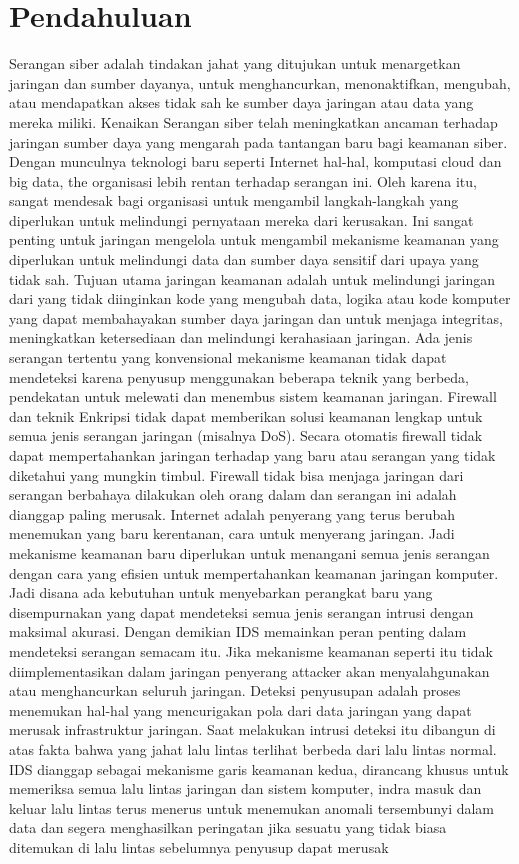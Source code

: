 \documentclass[conference]{IEEEtran}
\begin{document}
\section{Pendahuluan}
Serangan siber adalah tindakan jahat yang ditujukan untuk menargetkan jaringan dan sumber dayanya, untuk menghancurkan, menonaktifkan, mengubah, atau mendapatkan akses tidak sah ke sumber daya jaringan atau data yang mereka miliki\cite{bechhofer2009owl}. Kenaikan Serangan siber telah meningkatkan ancaman terhadap jaringan sumber daya yang mengarah pada tantangan baru bagi keamanan siber. Dengan munculnya teknologi baru seperti Internet hal-hal, komputasi cloud dan big data, the organisasi lebih rentan terhadap serangan ini. Oleh karena itu, sangat mendesak bagi organisasi untuk mengambil langkah-langkah yang diperlukan untuk melindungi pernyataan mereka dari kerusakan\cite{masoodi2019security}. Ini sangat penting untuk jaringan mengelola untuk mengambil mekanisme keamanan yang diperlukan untuk melindungi data dan sumber daya sensitif dari upaya yang tidak sah. Tujuan utama jaringan keamanan adalah untuk melindungi jaringan dari yang tidak diinginkan kode yang mengubah data, logika atau kode komputer yang dapat membahayakan sumber daya jaringan dan untuk menjaga integritas, meningkatkan ketersediaan dan melindungi kerahasiaan jaringan. Ada jenis serangan tertentu yang konvensional mekanisme keamanan tidak dapat mendeteksi karena penyusup menggunakan beberapa teknik yang berbeda, pendekatan untuk melewati dan menembus sistem keamanan jaringan. Firewall dan teknik Enkripsi tidak dapat memberikan solusi keamanan lengkap untuk semua jenis serangan jaringan (misalnya DoS). Secara otomatis firewall tidak dapat mempertahankan jaringan terhadap yang baru atau serangan yang tidak diketahui yang mungkin timbul. Firewall tidak bisa menjaga jaringan dari serangan berbahaya dilakukan oleh orang dalam dan serangan ini adalah dianggap paling merusak\cite{bamhdi2021ensemble}. Internet adalah penyerang yang terus berubah menemukan yang baru kerentanan, cara untuk menyerang jaringan. Jadi mekanisme keamanan baru diperlukan untuk menangani semua jenis serangan dengan cara yang efisien untuk mempertahankan keamanan jaringan komputer. Jadi disana ada kebutuhan untuk menyebarkan perangkat baru yang disempurnakan yang dapat mendeteksi semua jenis serangan intrusi dengan maksimal akurasi\cite{yang2015evaluating}. Dengan demikian IDS memainkan peran penting dalam mendeteksi serangan semacam itu. Jika mekanisme keamanan seperti itu tidak diimplementasikan dalam jaringan penyerang attacker akan menyalahgunakan atau menghancurkan seluruh jaringan. Deteksi penyusupan adalah proses menemukan hal-hal yang mencurigakan pola dari data jaringan yang dapat merusak infrastruktur jaringan\cite{sain1996nature}. Saat melakukan intrusi deteksi itu dibangun di atas fakta bahwa yang jahat lalu lintas terlihat berbeda dari lalu lintas normal. IDS dianggap sebagai mekanisme garis keamanan kedua, dirancang khusus untuk memeriksa semua lalu lintas jaringan dan sistem komputer, indra masuk dan keluar lalu lintas terus menerus untuk menemukan anomali tersembunyi dalam data dan segera menghasilkan peringatan jika sesuatu yang tidak biasa ditemukan di lalu lintas sebelumnya penyusup dapat merusak 
\end{document}
